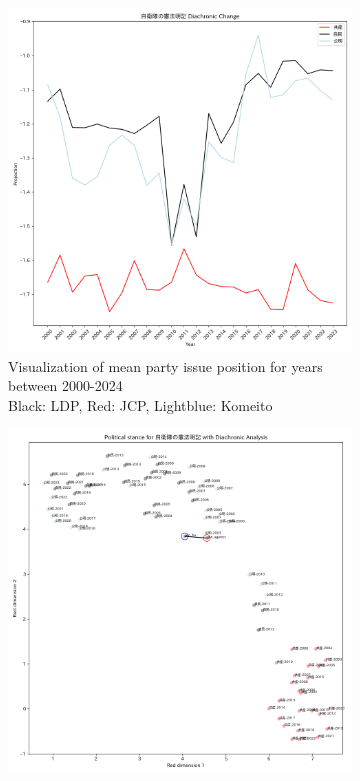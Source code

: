 \documentclass[final,5p,times,twocolumn,authoryear]{elsarticle}
\begin{document}
\begin{figure}[h]
	\centering
		\begin{subfigure}{0.48\textwidth}
		  \centering
		  \includegraphics[width=\textwidth]{figs/results/diachronic_defence/constitution_diachronic_change.png}
		  \caption{Visualization of mean party issue position for years between 2000-2024 \\\hspace{\textwidth}Black: LDP, Red: JCP, Lightblue: Komeito}
		  \label{fig:sub1}
		\end{subfigure}
		\hfill
		\begin{subfigure}{0.48\textwidth}
		  \centering
		  \includegraphics[width=\textwidth]{figs/results/diachronic_defence/constitution_diachronic_umap.png}

\end{subfigure}
\end{figure}
\end{document}
